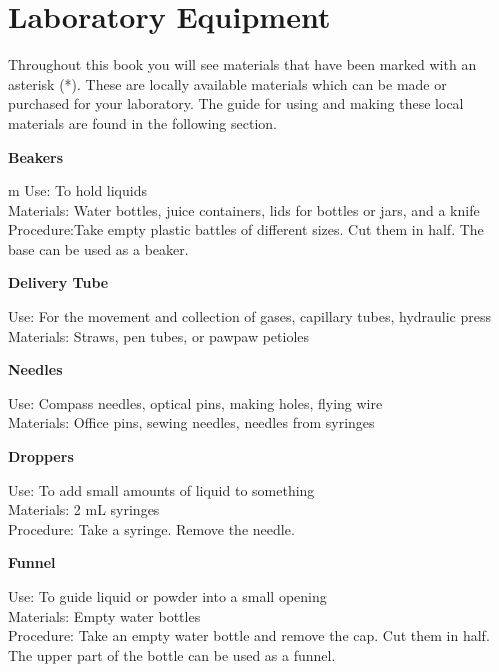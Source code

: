 \chapter{Laboratory Equipment}
Throughout this book you will see materials that have been marked with an asterisk (*). These are locally available materials which can be made or purchased for your laboratory. The guide for using and making these local materials are found in the following section.  

\begin{flushleft}
\textbf{Beakers}
\end{flushleft}
\vspace{-10pt}m
Use: To hold liquids\\
Materials: Water bottles, juice containers, lids for bottles or jars, and a knife\\
Procedure:Take empty plastic battles of different sizes. Cut them in half. The base can be used as a beaker.  \\

\begin{flushleft}
\textbf{Delivery Tube}
\end{flushleft}
\vspace{-10pt}
Use: For the movement and collection of gases, capillary tubes, hydraulic press\\
Materials: Straws, pen tubes, or pawpaw petioles\\

\begin{flushleft}
\textbf{Needles}
\end{flushleft}
\vspace{-10pt}
Use: Compass needles, optical pins, making holes, flying wire\\
Materials: Office pins, sewing needles, needles from syringes\\

\begin{flushleft}
\textbf{Droppers}
\end{flushleft}
\vspace{-10pt}
Use: To add small amounts of liquid to something\\
Materials: 2 mL syringes\\
Procedure: Take a syringe. Remove the needle. \\

\begin{flushleft}
\textbf{Funnel}
\end{flushleft}
\vspace{-10pt}
Use: To guide liquid or powder into a small opening\\
Materials: Empty water bottles\\
Procedure: Take an empty water bottle and remove the cap. Cut them in half. The upper part of the bottle can be used as a funnel.  \\

